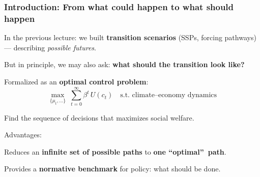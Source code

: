 \documentclass[xcolor=x11names,compress,aspectratio=169]{beamer}%
\makeatletter
\renewenvironment{itemize}{\begin{compactitemize}[<+-| alert@+>]}{\end{compactitemize}}
\makeatother
\begin{document}
\begin{frame}%
%

\frametitle{Introduction: From what could happen to what should happen}%


\begin{itemize}
\item In the previous lecture: we built \textbf{transition scenarios} (SSPs,
forcing pathways) --- describing \emph{possible futures}. \medskip

\item But in principle, we may also ask: \textbf{what should the transition
look like?}

\begin{itemize}
\item Formalized as an \textbf{optimal control problem}:
\[
\max_{\{\mu_{t},...\}}\;\sum_{t=0}^{\infty}\beta^{t}\,U(c_{t})\quad\text{s.t.
climate--economy dynamics}%
\]


\item Find the sequence of decisions that maximizes social welfare.
\end{itemize}

\medskip

\item Advantages:

\begin{itemize}
\item Reduces an \textbf{infinite set of possible paths} to \textbf{one
``optimal''\ path}.

\item Provides a \textbf{normative benchmark} for policy: what should be done.
\end{itemize}
\end{itemize}

%

\transboxout
\end{frame}%
%
\end{document}
